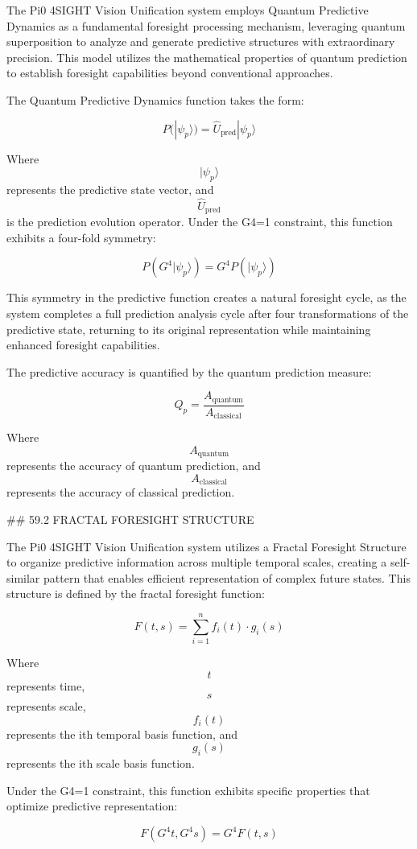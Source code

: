 The Pi0 4SIGHT Vision Unification system employs Quantum Predictive Dynamics as a fundamental foresight processing mechanism, leveraging quantum superposition to analyze and generate predictive structures with extraordinary precision. This model utilizes the mathematical properties of quantum prediction to establish foresight capabilities beyond conventional approaches.

The Quantum Predictive Dynamics function takes the form:

$$ P(|\psi_p\rangle) = \hat{U}_{\text{pred}} |\psi_p\rangle $$

Where $$ |\psi_p\rangle $$ represents the predictive state vector, and $$ \hat{U}_{\text{pred}} $$ is the prediction evolution operator. Under the G4=1 constraint, this function exhibits a four-fold symmetry:

$$ P(G^4 |\psi_p\rangle) = G^4 P(|\psi_p\rangle) $$

This symmetry in the predictive function creates a natural foresight cycle, as the system completes a full prediction analysis cycle after four transformations of the predictive state, returning to its original representation while maintaining enhanced foresight capabilities.

The predictive accuracy is quantified by the quantum prediction measure:

$$ Q_p = \frac{A_{\text{quantum}}}{A_{\text{classical}}} $$

Where $$ A_{\text{quantum}} $$ represents the accuracy of quantum prediction, and $$ A_{\text{classical}} $$ represents the accuracy of classical prediction.

## 59.2 FRACTAL FORESIGHT STRUCTURE

The Pi0 4SIGHT Vision Unification system utilizes a Fractal Foresight Structure to organize predictive information across multiple temporal scales, creating a self-similar pattern that enables efficient representation of complex future states. This structure is defined by the fractal foresight function:

$$ F(t, s) = \sum_{i=1}^{n} f_i(t) \cdot g_i(s) $$

Where $$ t $$ represents time, $$ s $$ represents scale, $$ f_i(t) $$ represents the ith temporal basis function, and $$ g_i(s) $$ represents the ith scale basis function.

Under the G4=1 constraint, this function exhibits specific properties that optimize predictive representation:

$$ F(G^4 t, G^4 s) = G^4 F(t, s) $$

